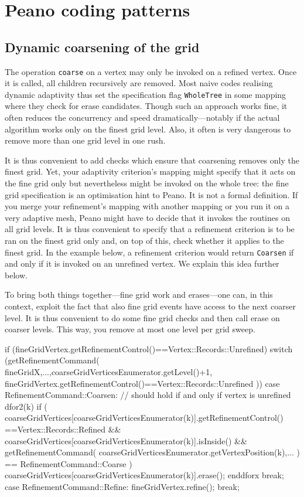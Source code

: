 \chapter{Peano coding patterns}

\section{Dynamic coarsening of the grid}

The operation \texttt{coarse} on a vertex may only be invoked on a refined
vertex.
Once it is called, all children recursively are removed.
Most naive codes realising dynamic adaptivity thus set the specification flag
\texttt{WholeTree} in some mapping where they check for erase candidates.
Though such an approach works fine, it often reduces the concurrency and speed
dramatically---notably if the actual algorithm works only on the finest grid
level. 
Also, it often is very dangerous to remove more than one grid level in one rush.


It is thus convenient to add checks which ensure that coarsening removes only
the finest grid.
Yet, your adaptivity criterion's mapping might specify that it acts
on the fine grid only but nevertheless might be invoked on the whole tree:
the fine grid specification is an optimisation hint to Peano. 
It is not a formal definition.
If you merge your refinement's mapping with another mapping or you run it 
on a very adaptive mesh, Peano might have to decide that it invokes the routines
on all grid levels.
It is thus convenient to specify that a refinement criterion is to be ran on the
finest grid only and, on top of this, check whether it applies to the finest
grid. 
In the example below, a refinement criterion would return \texttt{Coarsen} if
and only if it is invoked on an unrefined vertex.
We explain this idea further below.


To bring both things together---fine grid work and erases---one can, in this
context, exploit the fact that also fine grid events have access to the next
coarser level.
It is thus convenient to do some fine grid checks and then call erase on coarser
levels.
This way, you remove at most one level per grid sweep. 

\begin{code}
if (fineGridVertex.getRefinementControl()==Vertex::Records::Unrefined) {
 switch (getRefinementCommand(
   fineGridX,...,coarseGridVerticesEnumerator.getLevel()+1,
   fineGridVertex.getRefinementControl()==Vertex::Records::Unrefined
 )) { 
  case RefinementCommand::Coarsen:
   {
    // should hold if and only if vertex is unrefined
    dfor2(k)
     if (
      coarseGridVertices[coarseGridVerticesEnumerator(k)].getRefinementControl()
        ==Vertex::Records::Refined
      &&
      coarseGridVertices[coarseGridVerticesEnumerator(k)].isInside()
      &&
      getRefinementCommand(
       coarseGridVerticesEnumerator.getVertexPosition(k),...
      ) == RefinementCommand::Coarse
     ) {
      coarseGridVertices[coarseGridVerticesEnumerator(k)].erase();
     }
    enddforx
   }
   break;
   case RefinementCommand::Refine:
    fineGridVertex.refine();
    break;
 }
}
\end{code}

